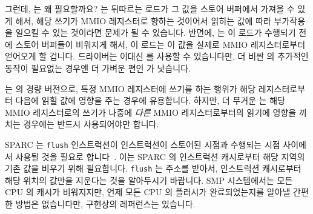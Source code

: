 그런데,  는 왜 필요할까요?
 는 뒤따르는 로드가 그 값을 스토어 버퍼에서 가져올 수
있게 해서, 해당 쓰기가 MMIO 레지스터로 향하는 것이어서 읽히는 값에 따라
부가작용을 일으킬 수 있는 것이라면 문제가 될 수 있습니다.
반면에,  는 이 로드가 수행되기 전에 스토어 버퍼들이
비워지게 해서, 이 로드는 이 값을 실제로 MMIO 레지스터로부터 얻어오게 할 겁니다.
드라이버는 이대신  를 사용할 수 있습니다만, 더 비싼
 의 추가적인 동작이 필요없는 경우엔 더 가벼운 편인
 가 낫습니다.

 는  의 경량 버전으로, 특정 MMIO
레지스터에 쓰기를 하는 행위가 해당 레지스터로부터 다음에 읽힐 값에 영향을 주는
경우에 유용합니다.
하지만, 더 무거운  는 해당 MMIO 레지스터로의 쓰기가
나중에 {\em 다른} MMIO 레지스터로부터의 읽기에 영향을 끼치는 경우에는 반드시
사용되어야만 합니다.

SPARC 는 {\tt flush} 인스트럭션이 인스트럭션이 스토어된 시점과 수행되는 시점
사이에서 사용될 것을 필요로 합니다~\cite{SPARC94}.
이는 SPARC 의 인스트럭션 캐시로부터 해당 지역의 기존 값을 비우기 위해
필요합니다.
{\tt flush} 는 주소를 받아서, 인스트럭션 캐시로부터 해당 위치의 값만을 지운다는
것을 알아두시기 바랍니다.
SMP 시스템에서는 모든 CPU 의 캐시가 비워지지만, 언제 모든 CPU 의 플러시가
완료되었는지를 알아낼 간편한 방법은 없습니다만, 구현상의 레퍼런스는 있습니다.
\iffalse

